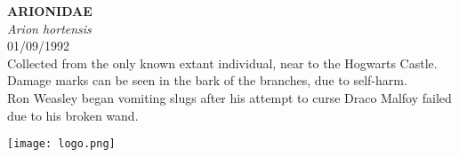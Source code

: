 \documentclass[
  landscape]{article}
\begin{document}
\begin{mdframed}[linecolor=mycolortext, linewidth=2pt, backgroundcolor=mycolor]

  \bigskip
  \begin{flushright}
  \begin{minipage}[t][-50ex][t]{16em}  
  \end{minipage}
  \end{flushright}
  \bigskip
  \begin{adjustwidth}{1cm}{1cm}
  {\fontsize{50pt}{0pt}\selectfont\bf\textcolor{mycolortext}{ ARIONIDAE }} \\
  \linebreak
  \linebreak
  {\fontsize{40pt}{100pt}\selectfont\textcolor{mycolortext}{\emph{ Arion hortensis }}} \\
  \vfill
  {\fontsize{30pt}{100pt}\selectfont\textcolor{mycolortext}{ 01/09/1992 }} \\
  \vfill
  {\fontsize{30pt}{100pt}\selectfont\textcolor{mycolortext}{ Collected from the only known extant individual, near to the Hogwarts Castle. Damage marks can be seen in the bark of the branches, due to self-harm. }} \\
  \vfill
  {\fontsize{30pt}{50pt}\selectfont\textcolor{mycolortext}{ Ron Weasley began vomiting slugs after his attempt to curse Draco Malfoy failed due to his broken wand. }} \\
  \end{adjustwidth}
  \begin{center}
  \texttt{[image: logo.png]}
  \end{center}
  \end{mdframed}
  \pagebreak

\end{document}
